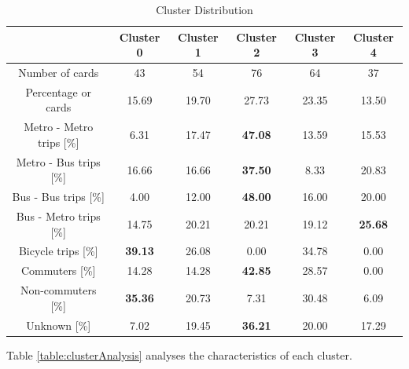 \documentclass{article}
\begin{document}
\begin{table}[H]
\centering
\begin{tabular}{||c|c|c|c|c|c||}
\hline
 & \textbf{Cluster 0} & \textbf{Cluster 1} & \textbf{Cluster 2} & \textbf{Cluster 3} & \textbf{Cluster 4} \\
[0.5ex] 
\hline \hline
Number of cards & 43 & 54 & 76 & 64 & 37 \\
Percentage or cards & 15.69 & 19.70 & 27.73 & 23.35 & 13.50 \\
\hline
Metro - Metro trips [\%] & 6.31 & 17.47 & \textbf{47.08} & 13.59 & 15.53 \\ 
Metro - Bus trips [\%] & 16.66 & 16.66 & \textbf{37.50} & 8.33 & 20.83 \\
Bus - Bus trips [\%] & 4.00 & 12.00 & \textbf{48.00} & 16.00 & 20.00 \\ 
Bus - Metro trips [\%] & 14.75 & 20.21 & 20.21 & 19.12 & \textbf{25.68} \\ 
Bicycle trips [\%] & \textbf{39.13} & 26.08 & 0.00 & 34.78 & 0.00 \\
\hline
Commuters [\%] & 14.28 & 14.28 & \textbf{42.85} & 28.57 & 0.00 \\ 
Non-commuters [\%] & \textbf{35.36} & 20.73 & 7.31 & 30.48 & 6.09 \\ 
Unknown [\%] & 7.02 & 19.45 & \textbf{36.21} & 20.00 & 17.29 \\  [1ex]
\hline 
\end{tabular}
\caption{Cluster Distribution} %
\label{table:clusterDistribution}
\end{table}


Table \ref{table:clusterAnalysis} analyses the characteristics of each cluster. 
\end{document}
